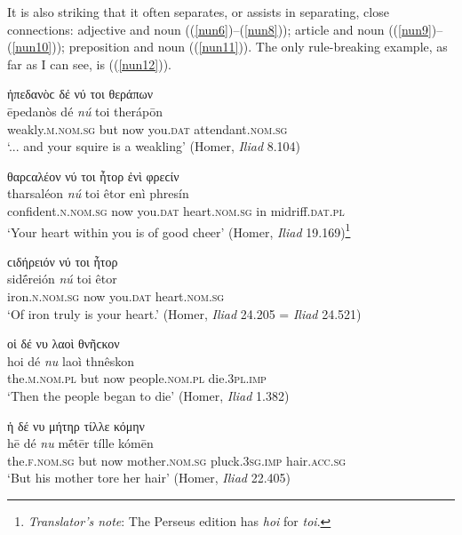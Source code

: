 It is also striking that it often separates, or assists in separating, close connections: adjective and noun ((\ref{nun6})--(\ref{nun8})); article and noun ((\ref{nun9})--(\ref{nun10})); preposition and noun ((\ref{nun11})). The only rule-breaking example, as far as I can see, is ((\ref{nun12})).

\begin{exe}
\ex ἠπεδανὸϲ δέ νύ τοι θεράπων\\
\gll ēpedanòs dé \emph{nú} toi therápōn\\
weakly.\textsc{m.nom.sg} but now you.\textsc{dat} attendant.\textsc{nom.sg}\\
\trans `... and your squire is a weakling' (Homer, \textit{Iliad} 8.104)
\label{nun6}
\end{exe}

\begin{exe}
\ex θαρϲαλέον νύ τοι ἦτορ ἐνὶ φρεϲίν\\
\gll tharsaléon \emph{nú} toi êtor enì phresín\\
confident.\textsc{n.nom.sg} now you.\textsc{dat} heart.\textsc{nom.sg} in midriff.\textsc{dat.pl}\\
\trans `Your heart within you is of good cheer' (Homer, \textit{Iliad} 19.169)\footnote{\emph{Translator's note}: The Perseus edition has \textit{hoi} for \textit{toi}.}
\label{nun7}
\end{exe}

\begin{exe}
\ex ϲιδήρειόν νύ τοι ἦτορ\\
\gll sidḗreión \emph{nú} toi êtor\\
iron.\textsc{n.nom.sg} now you.\textsc{dat} heart.\textsc{nom.sg}\\
\trans `Of iron truly is your heart.' (Homer, \textit{Iliad} 24.205 = \textit{Iliad} 24.521)
\label{nun8}
\end{exe}

\begin{exe}
\ex οἱ δέ νυ λαοὶ θνῆϲκον\\
\gll hoi dé \emph{nu} laoì thnêskon\\
the.\textsc{m.nom.pl} but now people.\textsc{nom.pl}
die.\textsc{3pl.imp}\\
\trans `Then the people began to die' (Homer, \textit{Iliad} 1.382)
\label{nun9}
\end{exe}

\begin{exe}
\ex ἡ δέ νυ μήτηρ τίλλε κόμην\\
\gll hē dé \emph{nu} mḗtēr tílle kómēn\\ 
the.\textsc{f.nom.sg} but now mother.\textsc{nom.sg} pluck.\textsc{3sg.imp} hair.\textsc{acc.sg}\\
\trans `But his mother tore her hair' (Homer, \textit{Iliad} 22.405)
\label{nun10}
\end{exe}

